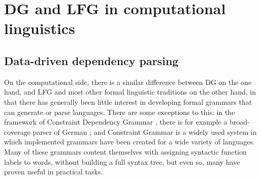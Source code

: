 \documentclass[output=paper,hidelinks]{langscibook}
\begin{document}






\section{DG and LFG in computational linguistics}\label{sec:Dependency:computational}
\subsection{Data-driven dependency parsing}
On the computational side, there is a similar difference between DG on
the one hand, and LFG and most other formal linguistic traditions on
the other hand, in
that there has generally been little interest in developing formal
grammars that can generate or parse languages. There are some
exceptions to this: in the framework of Constraint Dependency Grammar
\citep{Maruyama1990}, there is for example a broad-coverage parser of
German \citep{FothEtAl2005}; and Constraint Grammar
\citep{karlsson1995} is a widely used system in which implemented
grammars have been created for a wide variety of languages. Many of
these grammars content themselves with assigning syntactic function
labels to words, without building a full syntax tree, but even so,
many have proven useful in practical tasks.
\end{document}
